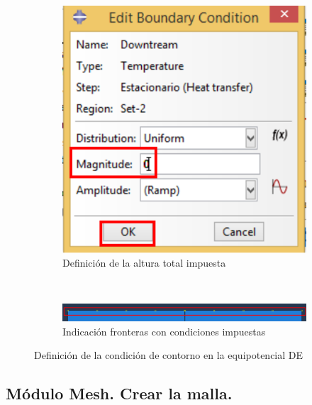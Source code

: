\begin{figure}
    \begin{subfigure}[!h]{0.42\textwidth}
      \includegraphics[width=\textwidth]{./body/images/load08.pdf}
      \caption{Definición de la altura total impuesta}
      \label{load08}
    \end{subfigure}%
    ~ %
    \begin{subfigure}[!h]{0.55\textwidth}
      \includegraphics[width=\textwidth]{./body/images/load09.pdf}
      \caption{Indicación fronteras con condiciones impuestas}
      \label{load09}
    \end{subfigure}%
    \caption{Definición de la condición de contorno en la
      equipotencial DE}
  \end{figure}


\subsection{Módulo Mesh. Crear la malla.}

